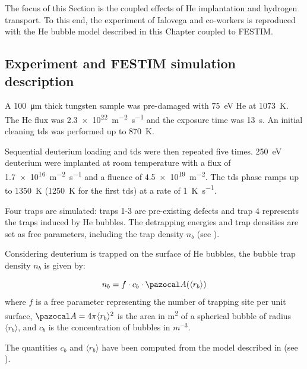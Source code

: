 The focus of this Section is the coupled effects of \gls{He} implantation and hydrogen transport.
To this end, the experiment of Ialovega and co-workers  is reproduced with the \gls{He} bubble model described in this Chapter coupled to FESTIM.

\subsection{Experiment and FESTIM simulation description}

A \SI{100}{\micro\metre} thick tungsten sample was pre-damaged with \SI{75}{eV} He at \SI{1073}{K}.
The \gls{He} flux was \SI{2.3e22}{m^{-2}.s^{-1}} and the exposure time was \SI{13}{s}.
An initial cleaning \gls{tds} was performed up to \SI{870}{K}.

Sequential deuterium loading and \gls{tds} were then repeated five times.
\SI{250}{eV} deuterium were implanted at room temperature with a flux of \SI{1.7e16}{m^{-2}.s^{-1}} and a \gls{fluence} of \SI{4.5e19}{m^{-2}}.
The \gls{tds} phase ramps up to \SI{1350}{K} (\SI{1250}{K} for the first \gls{tds}) at a rate of \SI{1}{K.s^{-1}}.

Four traps are simulated: traps 1-3 are pre-existing defects and trap 4 represents the traps induced by \gls{He} bubbles.
The detrapping energies and trap densities are set as free parameters, including the trap density $n_b$ (see ).

Considering deuterium is trapped on the surface of \gls{He} bubbles, the bubble trap density $n_b$ is given by:

\begin{equation}
    n_b = f \cdot c_b \cdot \Ab(\langle r_b \rangle)
\end{equation}
where $f$ is a free parameter representing the number of trapping site per unit surface, $\Ab = 4\pi \langle r_b \rangle^2$ is the area in \si{m^2} of a spherical bubble of radius $\langle r_b \rangle$, and $c_b$ is the concentration of bubbles in $\si{m^{-3}}$.

The quantities $c_b$ and $\langle r_b \rangle$ have been computed from the model described in  (see ).

